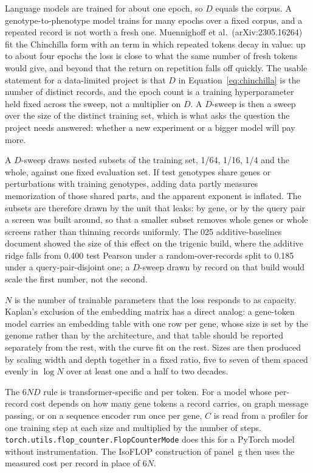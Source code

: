 Language models are trained for about one epoch, so $D$ equals the corpus. A
genotype-to-phenotype model trains for many epochs over a fixed corpus, and a
repeated record is not worth a fresh one. Muennighoff et al.\
(arXiv:2305.16264) fit the
Chinchilla form with an \term{effective data} term in which repeated tokens
decay in value: up to about four epochs the loss is close to what the same number
of fresh tokens would give, and beyond that the return on repetition falls off
quickly. The usable statement for a data-limited project is that $D$ in
Equation~\ref{eq:chinchilla} is the number of distinct records, and the epoch
count is a training hyperparameter held fixed across the sweep, not a multiplier
on $D$. A $D$-sweep is then a sweep over the size of the distinct training set,
which is what asks the question the project needs answered: whether a new
experiment or a bigger model will pay more.

A $D$-sweep draws nested subsets of the training set, 1/64, 1/16, 1/4 and the
whole, against one fixed evaluation set. If test genotypes share genes or
perturbations with training genotypes, adding data partly measures memorization of
those shared parts, and the apparent exponent is inflated. The subsets are
therefore drawn by the unit that leaks: by gene, or by the query pair a screen was
built around, so that a smaller subset removes whole genes or whole screens rather
than thinning records uniformly. The 025 additive-baselines document showed the
size of this effect on the trigenic build, where the additive ridge falls from
0.400 test Pearson under a random-over-records split to 0.185 under a
query-pair-disjoint one; a $D$-sweep drawn by record on that build would scale
the first number, not the second.

$N$ is the number of trainable parameters that the loss responds to as capacity.
Kaplan's exclusion of the embedding matrix has a direct analog: a gene-token model
carries an embedding table with one row per gene, whose size is set by the genome
rather than by the architecture, and that table should be reported separately
from the rest, with the curve fit on the rest. Sizes are then produced by scaling
width and depth together in a fixed ratio, five to seven of them spaced evenly in
$\log N$ over at least one and a half to two decades.

The $6ND$ rule is transformer-specific and per token. For a model whose per-record
cost depends on how many gene tokens a record carries, on graph message passing,
or on a sequence encoder run once per gene, $C$ is read from a profiler for one
training step at each size and multiplied by the number of steps.
\texttt{torch.utils.flop\_counter.FlopCounterMode} does this for a PyTorch model
without instrumentation. The IsoFLOP construction of panel~g then uses the measured
cost per record in place of $6N$.

